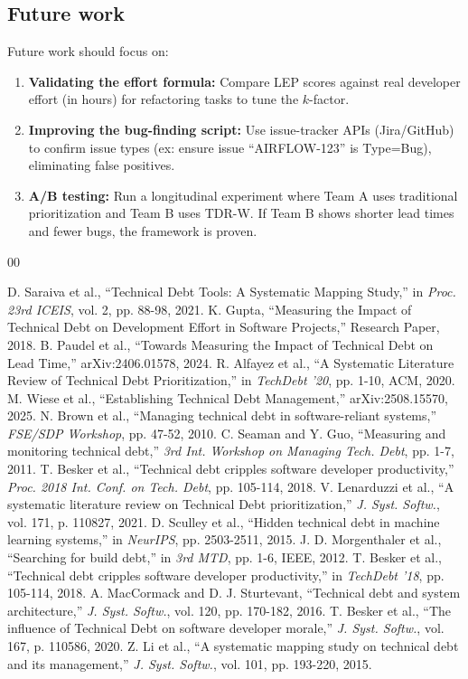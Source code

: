 \documentclass[journal]{IEEEtran}
\begin{document}
\subsection{Future work}
Future work should focus on:
\begin{enumerate}
    \item \textbf{Validating the effort formula:} Compare LEP scores against real developer effort (in hours) for refactoring tasks to tune the $k$-factor.
    \item \textbf{Improving the bug-finding script:} Use issue-tracker APIs (Jira/GitHub) to confirm issue types (ex: ensure issue ``AIRFLOW-123'' is Type=Bug), eliminating false positives.
    \item \textbf{A/B testing:} Run a longitudinal experiment where Team A uses traditional prioritization and Team B uses TDR-W. If Team B shows shorter lead times and fewer bugs, the framework is proven.
\end{enumerate}

\begin{thebibliography}{00}

 D. Saraiva et al., ``Technical Debt Tools: A Systematic Mapping Study,'' in \textit{Proc. 23rd ICEIS}, vol. 2, pp. 88-98, 2021.
 K. Gupta, ``Measuring the Impact of Technical Debt on Development Effort in Software Projects,'' Research Paper, 2018.
 B. Paudel et al., ``Towards Measuring the Impact of Technical Debt on Lead Time,'' arXiv:2406.01578, 2024.
 R. Alfayez et al., ``A Systematic Literature Review of Technical Debt Prioritization,'' in \textit{TechDebt '20}, pp. 1-10, ACM, 2020.
 M. Wiese et al., ``Establishing Technical Debt Management,'' arXiv:2508.15570, 2025.
 N. Brown et al., ``Managing technical debt in software-reliant systems,'' \textit{FSE/SDP Workshop}, pp. 47-52, 2010.
 C. Seaman and Y. Guo, ``Measuring and monitoring technical debt,'' \textit{3rd Int. Workshop on Managing Tech. Debt}, pp. 1-7, 2011.
 T. Besker et al., ``Technical debt cripples software developer productivity,'' \textit{Proc. 2018 Int. Conf. on Tech. Debt}, pp. 105-114, 2018.
 V. Lenarduzzi et al., ``A systematic literature review on Technical Debt prioritization,'' \textit{J. Syst. Softw.}, vol. 171, p. 110827, 2021.
 D. Sculley et al., ``Hidden technical debt in machine learning systems,'' in \textit{NeurIPS}, pp. 2503-2511, 2015.
 J. D. Morgenthaler et al., ``Searching for build debt,'' in \textit{3rd MTD}, pp. 1-6, IEEE, 2012.
 T. Besker et al., ``Technical debt cripples software developer productivity,'' in \textit{TechDebt '18}, pp. 105-114, 2018.
 A. MacCormack and D. J. Sturtevant, ``Technical debt and system architecture,'' \textit{J. Syst. Softw.}, vol. 120, pp. 170-182, 2016.
 T. Besker et al., ``The influence of Technical Debt on software developer morale,'' \textit{J. Syst. Softw.}, vol. 167, p. 110586, 2020.
 Z. Li et al., ``A systematic mapping study on technical debt and its management,'' \textit{J. Syst. Softw.}, vol. 101, pp. 193-220, 2015.

\end{thebibliography}
\end{document}
